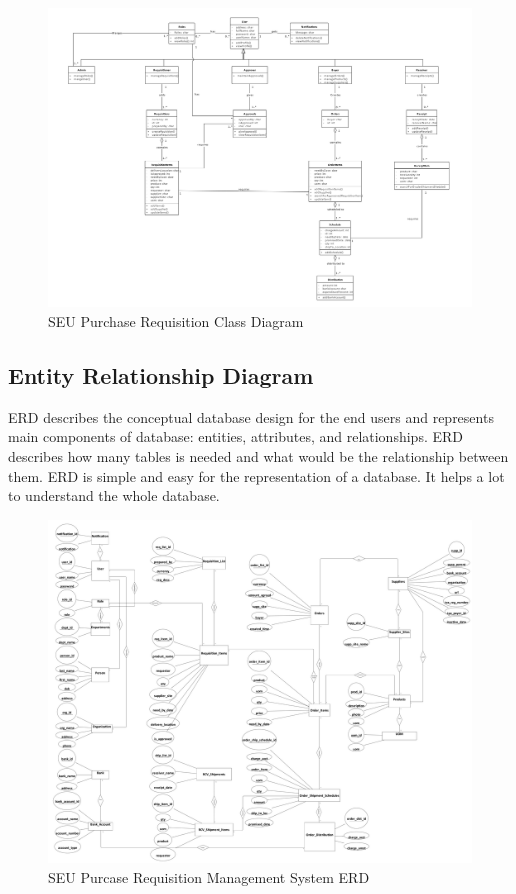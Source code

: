 \documentclass[12pt]{report} %
\begin{document}
\begin{figure}[h]
	\includegraphics[width=1.1\textwidth]{pic/class/seupr_class.png}
	\caption{SEU Purchase Requisition Class Diagram}
	\label{fig:Class_Diagram}
\end{figure}
\clearpage



\subsection{Entity Relationship Diagram}
ERD describes the conceptual database design for the end users and represents  main components of database: entities, attributes, and relationships. ERD describes how many tables is needed and what would be the relationship between them. ERD is simple and easy for the representation of a database. It helps a lot to understand the whole database.\\

\begin{figure}[h]
	\begin{center}
	\includegraphics[width=1.1\textwidth]{pic/erd/erd_full.png}
	\end{center}
	\caption{SEU Purcase Requisition Management System ERD}
	\label{fig:erd_full1}
\end{figure}
\clearpage
\end{document}
